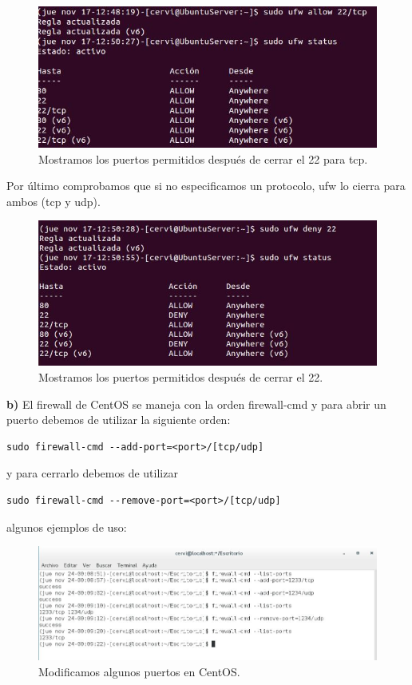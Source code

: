 \begin{figure}[H]
	\centering
	\includegraphics[scale=0.75]{ufw-allow.jpg}
	\caption{Mostramos los puertos permitidos después de cerrar el 22 para tcp. \label{fig:figura3}}
\end{figure}

Por último comprobamos que si no especificamos un protocolo, ufw lo cierra para ambos (tcp y udp).
\begin{figure}[H]
	\centering
	\includegraphics[scale=0.75]{ufw-deny-22.jpg}
	\caption{Mostramos los puertos permitidos después de cerrar el 22. \label{fig:figura4}}
\end{figure}

\textbf{b) } El firewall de CentOS se maneja con la orden firewall-cmd y para abrir un puerto debemos de utilizar la siguiente orden:
\begin{verbatim}sudo firewall-cmd --add-port=<port>/[tcp/udp]\end{verbatim}
y para cerrarlo debemos de utilizar
\begin{verbatim}sudo firewall-cmd --remove-port=<port>/[tcp/udp]\end{verbatim}

algunos ejemplos de uso:
\begin{figure}[H]
	\centering
	\includegraphics[scale=0.75]{firewall-cmd.jpg}
	\caption{Modificamos algunos puertos en CentOS. \label{fig:figura27}}
\end{figure}

